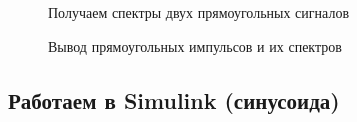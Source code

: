 \documentclass[12pt,a4paper]{scrartcl}
\begin{document}
\begin{figure}[h!]
\caption{Получаем спектры двух прямоугольных сигналов}
\end{figure}

\begin{figure}[h!]
\caption{Вывод прямоугольных импульсов и их спектров}
\end{figure}

\newpage
\subsection{Работаем в Simulink (синусоида)}
\label{sec:workSim1}
\end{document}
